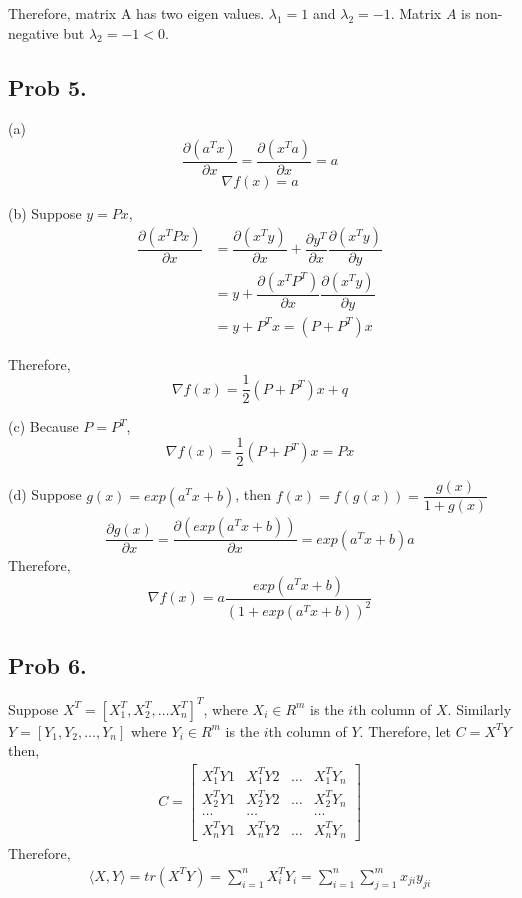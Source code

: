 \documentclass[10pt,a4paper]{article}
\begin{document}
Therefore, matrix A has two eigen values. $\lambda_1 = 1$ and $\lambda_2 = -1$. Matrix $A$ is non-negative but $\lambda_2 = -1< 0$.

\subsection{Prob 5.}

(a) 
$$\dfrac{\partial (a^Tx)}{\partial x} = \dfrac{\partial (x^Ta)}{\partial x} = a$$
$$ \nabla f(x) = a$$

(b)
Suppose $y=Px$,
\begin{align*}
\dfrac{\partial (x^TPx)}{\partial x} &= \dfrac{\partial (x^Ty)}{\partial x} +  \dfrac{\partial y^T}{\partial x} \dfrac{\partial (x^Ty)}{\partial y} \\
&= y + \dfrac{\partial (x^TP^T)}{\partial x} \dfrac{\partial (x^Ty)}{\partial y} \\
&= y + P^Tx = (P+P^T)x
\end{align*}

Therefore,
$$ \nabla f(x) = \dfrac{1}{2}(P+P^T)x + q$$

(c)
Because $P=P^T$,
$$ \nabla f(x) = \dfrac{1}{2}(P+P^T)x = Px$$

(d)
Suppose $g(x)= exp(a^Tx+b)$, then $f(x)=f(g(x))=\dfrac{g(x)}{1+g(x)}$
\begin{align*}
\dfrac{\partial g(x)}{\partial x} = \dfrac{\partial (exp(a^Tx+b))}{\partial x} =  exp(a^Tx+b)a
\end{align*}
Therefore, $$ \nabla f(x) = a\dfrac{exp(a^Tx+b)}{(1+exp(a^Tx+b))^2}$$

\subsection{Prob 6.}
Suppose $X^T=[X_1^T, X_2^T,\dots X_n^T]^T$, where $X_i\in R^m$ is the $i$th column of $X$. Similarly $Y=[Y_1, Y_2,\dots ,Y_n]$ where $Y_i\in R^m$ is the $i$th column of $Y$. Therefore, let $C=X^TY$ then,
\begin{align*}
C = \left[ \begin{matrix}
X_1^TY1 & X_1^TY2 & \dots & X_1^TY_n \\
X_2^TY1 & X_2^TY2 & \dots & X_2^TY_n \\
\dots & \dots & &\dots\\
X_n^TY1 & X_n^TY2 & \dots & X_n^TY_n
\end{matrix} \right]
\end{align*}
Therefore,
\begin{align}
\label{eq:trace_innerp}
\langle X, Y\rangle=tr(X^TY)=\sum_{i=1}^{n}{X_i^TY_i}=\sum_{i=1}^{n}\sum_{j=1}^{m}{x_{ji}y_{ji}}
\end{align}
\end{document}
